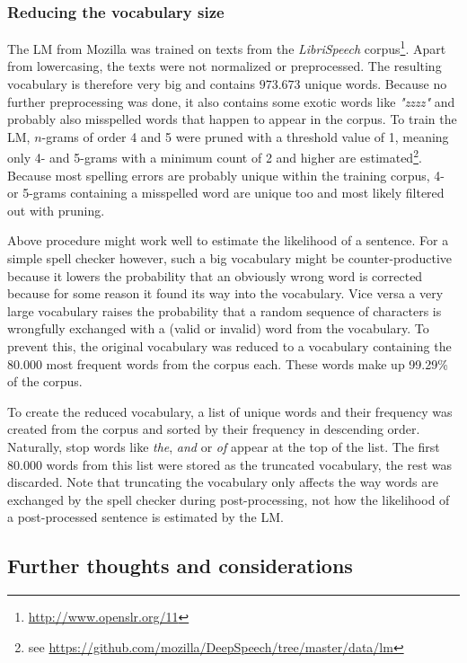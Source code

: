 \subsubsection{Reducing the vocabulary size}

The \ac{LM} from Mozilla was trained on texts from the \textit{LibriSpeech} corpus\footnote{\url{http://www.openslr.org/11}}. Apart from lowercasing, the texts were not normalized or preprocessed. The resulting vocabulary is therefore very big and contains $973.673$ unique words. Because no further preprocessing was done, it also contains some exotic words like \textit{"zzzz"} and probably also misspelled words that happen to appear in the corpus. To train the \ac{LM}, $n$-grams of order 4 and 5 were pruned with a threshold value of 1, meaning only 4- and 5-grams with a minimum count of 2 and higher are estimated\footnote{see \url{https://github.com/mozilla/DeepSpeech/tree/master/data/lm}}. Because most spelling errors are probably unique within the training corpus, 4- or 5-grams containing a misspelled word are unique too and most likely filtered out with pruning. 

Above procedure might work well to estimate the likelihood of a sentence. For a simple spell checker however, such a big vocabulary might be counter-productive because it lowers the probability that an obviously wrong word is corrected because for some reason it found its way into the vocabulary. Vice versa a very large vocabulary raises the probability that a random sequence of characters is wrongfully exchanged with a (valid or invalid) word from the vocabulary. To prevent this, the original vocabulary was reduced to a vocabulary containing the 80.000 most frequent words from the corpus each. These words make up 99.29\% of the corpus.

To create the reduced vocabulary, a list of unique words and their frequency was created from the corpus and sorted by their frequency in descending order. Naturally, stop words like \textit{the}, \textit{and} or \textit{of} appear at the top of the list. The first 80.000 words from this list were stored as the truncated vocabulary, the rest was discarded. Note that truncating the vocabulary only affects the way words are exchanged by the spell checker during post-processing, not how the likelihood of a post-processed sentence is estimated by the \ac{LM}.

\subsection{Further thoughts and considerations}

